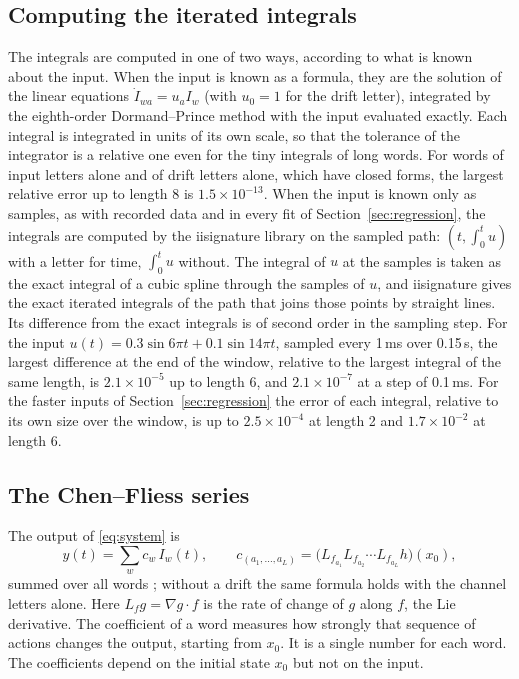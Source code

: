 \documentclass[11pt,a4paper]{article}
\theoremstyle{remark}
\begin{document}
\subsection{Computing the iterated integrals}\label{sec:computing}
The integrals are computed in one of two ways, according to what is known about the input.
When the input is known as a formula, they are the solution of the linear equations $\dot I_{wa}=u_aI_w$ (with $u_0=1$ for the drift letter), integrated by the eighth-order Dormand--Prince method \cite{HairerNorsettWanner1993} with the input evaluated exactly.
Each integral is integrated in units of its own scale, so that the tolerance of the integrator is a relative one even for the tiny integrals of long words.
For words of input letters alone and of drift letters alone, which have closed forms, the largest relative error up to length 8 is $1.5\times10^{-13}$.
When the input is known only as samples, as with recorded data and in every fit of Section~\ref{sec:regression}, the integrals are computed by the iisignature library \cite{ReizensteinGraham2020} on the sampled path: $(t,\int_0^tu)$ with a letter for time, $\int_0^tu$ without.
The integral of $u$ at the samples is taken as the exact integral of a cubic spline through the samples of $u$, and iisignature gives the exact iterated integrals of the path that joins those points by straight lines.
Its difference from the exact integrals is of second order in the sampling step.
For the input $u(t)=0.3\sin 6\pi t+0.1\sin 14\pi t$, sampled every 1\,ms over 0.15\,s, the largest difference at the end of the window, relative to the largest integral of the same length, is $2.1\times10^{-5}$ up to length 6, and $2.1\times10^{-7}$ at a step of 0.1\,ms.
For the faster inputs of Section~\ref{sec:regression} the error of each integral, relative to its own size over the window, is up to $2.5\times10^{-4}$ at length 2 and $1.7\times10^{-2}$ at length 6.

\subsection{The Chen--Fliess series}
The output of \eqref{eq:system} is
\begin{equation}\label{eq:cfs}
y(t)=\sum_{w} c_w\,I_w(t),\qquad c_{(a_1,\dots,a_L)}=\bigl(L_{f_{a_1}}L_{f_{a_2}}\cdots L_{f_{a_L}}h\bigr)(x_0),
\end{equation}
summed over all words \cite{Fliess1981,Isidori1995}; without a drift the same formula holds with the channel letters alone.
Here $L_fg=\nabla g\cdot f$ is the rate of change of $g$ along $f$, the Lie derivative.
The coefficient of a word measures how strongly that sequence of actions changes the output, starting from $x_0$.
It is a single number for each word.
The coefficients depend on the initial state $x_0$ but not on the input.
\end{document}
